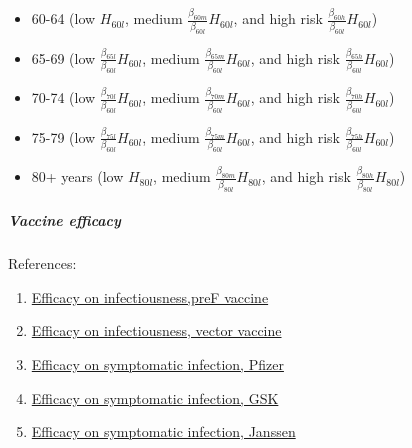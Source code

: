 \documentclass[
]{article}
\providecommand{\tightlist}{%
  \setlength{\itemsep}{0pt}\setlength{\parskip}{0pt}}
\begin{document}
\begin{itemize}
\tightlist
\item
  60-64 (low \(H_{60l}\), medium
  \(\frac{\beta_{60m}}{\beta_{60l}} H_{60l}\), and high risk
  \(\frac{\beta_{60h}}{\beta_{60l}} H_{60l}\))
\item
  65-69 (low \(\frac{\beta_{65l}}{\beta_{60l}}H_{60l}\), medium
  \(\frac{\beta_{65m}}{\beta_{60l}}H_{60l}\), and high risk
  \(\frac{\beta_{65h}}{\beta_{60l}}H_{60l}\))
\item
  70-74 (low \(\frac{\beta_{70l}}{\beta_{60l}}H_{60l}\), medium
  \(\frac{\beta_{70m}}{\beta_{60l}}H_{60l}\), and high risk
  \(\frac{\beta_{70h}}{\beta_{60l}}H_{60l}\))
\item
  75-79 (low \(\frac{\beta_{75l}}{\beta_{60l}}H_{60l}\), medium
  \(\frac{\beta_{75m}}{\beta_{60l}}H_{60l}\), and high risk
  \(\frac{\beta_{75h}}{\beta_{60l}}H_{60l}\))
\item
  80+ years (low \(H_{80l}\), medium
  \(\frac{\beta_{80m}}{\beta_{80l}}H_{80l}\), and high risk
  \(\frac{\beta_{80h}}{\beta_{80l}}H_{80l}\))\\
\end{itemize}

\hypertarget{vaccine-efficacy}{%
\subparagraph{Vaccine efficacy}\label{vaccine-efficacy}}

References:

\begin{enumerate}
\def\labelenumi{(\arabic{enumi})}
\tightlist
\item
  \href{https://www.nejm.org/doi/full/10.1056/NEJMoa2116154}{Efficacy on
  infectiousness,preF vaccine}
\item
  \href{https://academic.oup.com/jid/article/226/3/396/6064820}{Efficacy
  on infectiousness, vector vaccine}
\item
  \href{https://www.pfizer.com/news/press-release/press-release-detail/pfizer-announces-positive-top-line-data-phase-3-trial-older}{Efficacy
  on symptomatic infection, Pfizer}
\item
  \href{https://www.gsk.com/en-gb/media/press-releases/gsk-s-older-adult-respiratory-syncytial-virus-rsv-vaccine-candidate/}{Efficacy
  on symptomatic infection, GSK}
\item
  \href{https://www.jnj.com/janssen-announces-phase-2b-data-demonstrating-its-investigational-rsv-adult-vaccine-provided-80-protection-against-lower-respiratory-infections-in-older-adults}{Efficacy
  on symptomatic infection, Janssen}
\end{enumerate}
\end{document}
